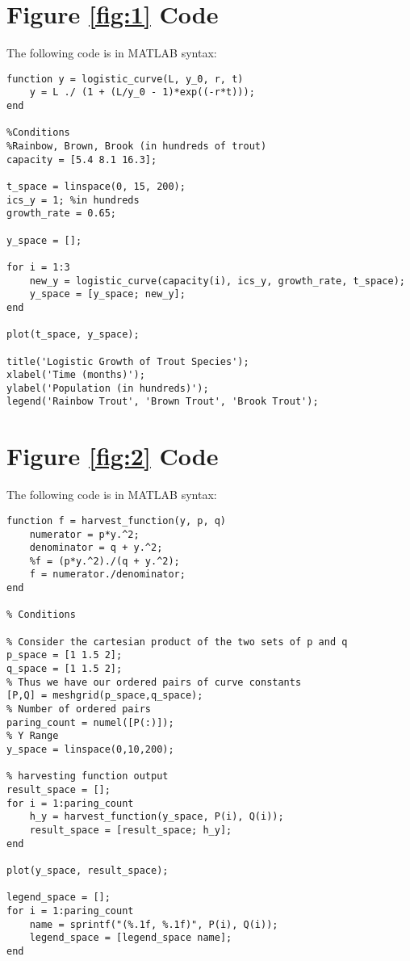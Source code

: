 \documentclass[letterpaper,12pt]{article}
\begin{document}
\pagebreak
\begin{appendices}
\section{Figure \ref{fig:1} Code} \label{appendix:A}
The following code is in MATLAB syntax:
\begin{spacing}{1}
\begin{lstlisting}
function y = logistic_curve(L, y_0, r, t)
    y = L ./ (1 + (L/y_0 - 1)*exp((-r*t)));
end

%Conditions
%Rainbow, Brown, Brook (in hundreds of trout)
capacity = [5.4 8.1 16.3];

t_space = linspace(0, 15, 200);
ics_y = 1; %in hundreds
growth_rate = 0.65;

y_space = [];

for i = 1:3
    new_y = logistic_curve(capacity(i), ics_y, growth_rate, t_space);
    y_space = [y_space; new_y];
end

plot(t_space, y_space);

title('Logistic Growth of Trout Species');
xlabel('Time (months)');
ylabel('Population (in hundreds)');
legend('Rainbow Trout', 'Brown Trout', 'Brook Trout'); 
\end{lstlisting}
\end{spacing}
\newpage
\section{Figure \ref{fig:2} Code} \label{appendix:B}
The following code is in MATLAB syntax:
\begin{spacing}{1}
\begin{lstlisting}
function f = harvest_function(y, p, q)
    numerator = p*y.^2;
    denominator = q + y.^2;
    %f = (p*y.^2)./(q + y.^2);
    f = numerator./denominator;
end

% Conditions

% Consider the cartesian product of the two sets of p and q
p_space = [1 1.5 2];
q_space = [1 1.5 2];
% Thus we have our ordered pairs of curve constants
[P,Q] = meshgrid(p_space,q_space);
% Number of ordered pairs
paring_count = numel([P(:)]);
% Y Range
y_space = linspace(0,10,200);

% harvesting function output
result_space = [];
for i = 1:paring_count
    h_y = harvest_function(y_space, P(i), Q(i));
    result_space = [result_space; h_y];
end

plot(y_space, result_space);

legend_space = [];
for i = 1:paring_count
    name = sprintf("(%.1f, %.1f)", P(i), Q(i));
    legend_space = [legend_space name];
end


\end{lstlisting}
\end{spacing}
\end{appendices}
\end{document}

